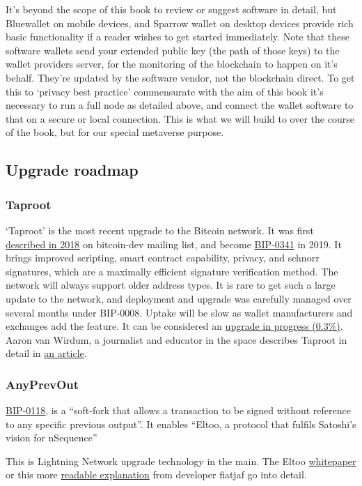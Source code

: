 It's beyond the scope of this book to review or suggest software in detail, but Bluewallet on mobile devices, and Sparrow wallet on desktop devices provide rich basic functionality if a reader wishes to get started immediately. Note that these software wallets send your extended public key (the path of those keys) to the wallet providers server, for the monitoring of the blockchain to happen on it's behalf. They're updated by the software vendor, not the blockchain direct. To get this to `privacy best practice' commensurate with the aim of this book it's necessary to run a full node as detailed above, and connect the wallet software to that on a secure or local connection. This is what we will build to over the course of the book, but for our special metaverse purpose. 
\subsection{Upgrade roadmap}
\subsubsection{Taproot}
`Taproot' is the most recent upgrade to the Bitcoin network. It was first \href{https://lists.linuxfoundation.org/pipermail/bitcoin-dev/2018-January/015614.html}{described in 2018} on bitcoin-dev mailing list, and become \href{https://github.com/bitcoin/bips/blob/master/bip-0341.mediawiki}{BIP-0341} in 2019. It brings improved scripting, smart contract capability, privacy, and schnorr signatures, which are a maximally efficient signature verification method. The network will always support older address types. It is rare to get such a large update to the network, and deployment and upgrade was carefully managed over several months under BIP-0008. Uptake will be slow as wallet manufacturers and exchanges add the feature. It can be considered an \href{https://transactionfee.info/charts/transactions-spending-taproot/}{upgrade in progress (0.3\%)}. Aaron van Wirdum, a journalist and educator in the space describes Taproot in detail in \href{https://bitcoinmagazine.com/technical/taproot-coming-what-it-and-how-it-will-benefit-bitcoin}{an article}.\par
\subsubsection{AnyPrevOut}
\href{https://anyprevout.xyz}{BIP-0118}, is a ``soft-fork that allows a transaction to be signed without reference to any specific previous output''. It enables ``Eltoo, a protocol that fulfils Satoshi's vision for nSequence''\par
This is Lightning Network upgrade technology in the main. The Eltoo \href{https://blockstream.com/eltoo.pdf}{whitepaper} or this more \href{https://fiatjaf.alhur.es/ffdfe772.html}{readable explanation} from developer fiatjaf go into detail.\par 
